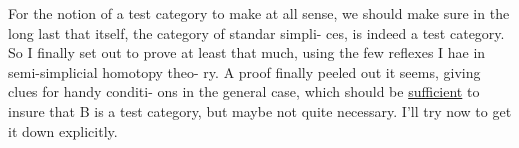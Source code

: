   For the notion of a test category to make at all  sense,  we should
make sure in the long last that \hand{$\Delta$} itself,  the category of standar simpli-%
ces,  is indeed a test category.  So I finally set out to prove at least
\margin{$\times$} that much,  using the few reflexes I hae in semi-simplicial homotopy theo-%
ry.  A proof finally peeled out it seems,  giving clues for handy conditi-%
ons in the general case,  which should be \uline{sufficient}  to insure
that B is a test category,  but maybe not quite necessary.  I'll try now
to get it down explicitly.

